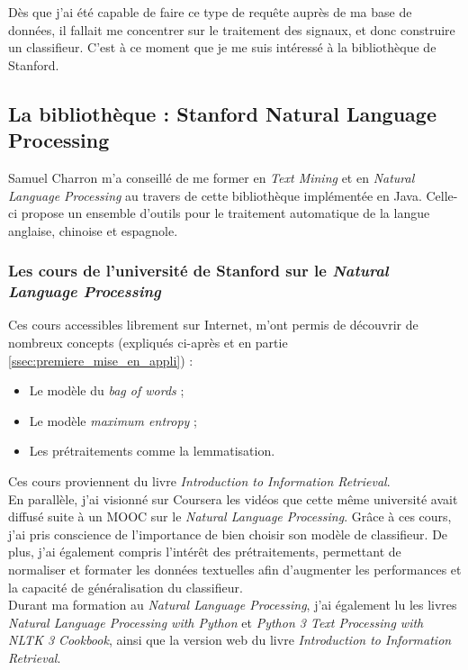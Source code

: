         Dès que j'ai été capable de faire ce type de requête auprès de ma base de données, il fallait me concentrer sur le traitement des signaux, et donc construire un classifieur. C'est à ce moment que je me suis intéressé à la bibliothèque de Stanford.

        \subsection{La bibliothèque : Stanford Natural Language Processing}
            Samuel Charron m'a conseillé de me former en \textit{Text Mining} et en \textit{Natural Language Processing} au travers de cette bibliothèque implémentée en Java. Celle-ci propose un ensemble d'outils pour le traitement automatique de la langue anglaise, chinoise et espagnole.

            \subsubsection{Les cours de l'université de Stanford sur le \textit{Natural Language Processing}}
                Ces cours accessibles librement sur Internet, m'ont permis de découvrir de nombreux concepts (expliqués ci-après et en partie \ref{ssec:premiere_mise_en_appli}) :
                \begin{itemize}
                    \item Le modèle du \textit{bag of words} ;
                    \item Le modèle \textit{maximum entropy} ;
                    \item Les prétraitements comme la lemmatisation.
                \end{itemize}
                Ces cours proviennent du livre \textit{Introduction to Information Retrieval}\autocite{ir_web}.\\

                En parallèle, j'ai visionné sur Coursera les vidéos que cette même université avait diffusé suite à un MOOC sur le \textit{Natural Language Processing}. Grâce à ces cours, j'ai pris conscience de l'importance de bien choisir son modèle de classifieur. De plus, j'ai également compris l'intérêt des prétraitements, permettant de normaliser et formater les données textuelles afin d'augmenter les performances et la capacité de généralisation du classifieur.\\

                Durant ma formation au \textit{Natural Language Processing}, j'ai également lu les livres \textit{Natural Language Processing with Python}\autocite{nlp_p} et \textit{Python 3 Text Processing with NLTK 3 Cookbook}\autocite{nltk}, ainsi que la version web du livre \textit{Introduction to Information Retrieval}\autocite{ir_web}.

